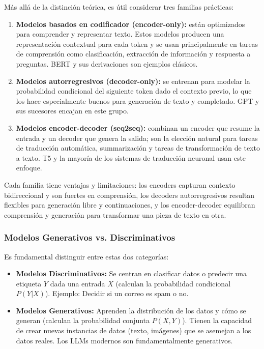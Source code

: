 \documentclass[11pt, a4paper]{article}
\begin{document}
Más allá de la distinción teórica, es útil considerar tres familias prácticas:
\begin{enumerate}
\item \textbf{Modelos basados en codificador (encoder-only):} están optimizados para comprender y representar texto. Estos modelos producen una representación contextual para
cada token y se usan principalmente en tareas de comprensión como clasificación, extracción de información y respuesta a preguntas. BERT y sus derivaciones son ejemplos clásicos.
\item \textbf{Modelos autorregresivos (decoder-only):} se entrenan para modelar la probabilidad condicional del siguiente token dado el contexto previo, lo que los hace especialmente
buenos para generación de texto y completado. GPT y sus sucesores encajan en este grupo.
\item \textbf{Modelos encoder-decoder (seq2seq):} combinan un encoder que resume la entrada y un decoder que genera la salida; son la elección natural para tareas de traducción 
automática, summarización y tareas de transformación de texto a texto. T5 y la mayoría de los sistemas de traducción neuronal usan este enfoque.
\end{enumerate}
Cada familia tiene ventajas y limitaciones: los encoders capturan contexto bidireccional y son fuertes en comprensión, los decoders autorregresivos resultan flexibles para generación
libre y continuaciones, y los encoder-decoder equilibran comprensión y generación para transformar una pieza de texto en otra.

\subsubsection{ Modelos Generativos vs. Discriminativos}
Es fundamental distinguir entre estas dos categorías:
\begin{itemize}
    \item \textbf{Modelos Discriminativos:} Se centran en clasificar datos o predecir una etiqueta $Y$ dada una entrada $X$ (calculan la probabilidad condicional $P(Y|X)$). 
    Ejemplo: Decidir si un correo es spam o no.
    \item \textbf{Modelos Generativos:} Aprenden la distribución de los datos y cómo se generan (calculan la probabilidad conjunta $P(X,Y)$). Tienen la capacidad de crear 
    nuevas instancias de datos (texto, imágenes) que se asemejan a los datos reales. Los LLMs modernos son fundamentalmente generativos.
\end{itemize}
\end{document}
